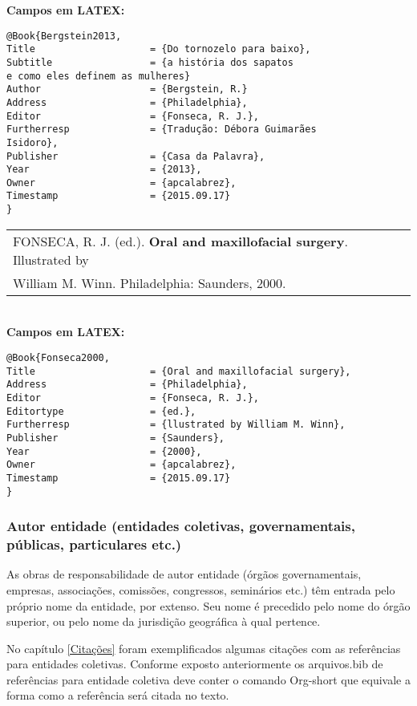 \textbf{Campos em LATEX:}

\begin{verbatim}
@Book{Bergstein2013,
Title                    = {Do tornozelo para baixo},
Subtitle                 = {a história dos sapatos 
e como eles definem as mulheres}
Author                   = {Bergstein, R.}
Address                  = {Philadelphia},
Editor                   = {Fonseca, R. J.},
Furtherresp              = {Tradução: Débora Guimarães
Isidoro},
Publisher                = {Casa da Palavra},
Year                     = {2013},
Owner                    = {apcalabrez},
Timestamp                = {2015.09.17}
}
\end{verbatim}

\begin{tabular}{|l|c|} \hline
	FONSECA, R. J. (ed.). \textbf{Oral and maxillofacial surgery}. Illustrated by\\
	William M. Winn. Philadelphia: Saunders, 2000. \\\hline
\end{tabular}\\

\textbf{Campos em LATEX:}

\begin{verbatim}
@Book{Fonseca2000,
Title                    = {Oral and maxillofacial surgery},
Address                  = {Philadelphia},
Editor                   = {Fonseca, R. J.},
Editortype               = {ed.},
Furtherresp              = {llustrated by William M. Winn},
Publisher                = {Saunders},
Year                     = {2000},
Owner                    = {apcalabrez},
Timestamp                = {2015.09.17}
}
\end{verbatim}


\subsubsection{Autor entidade (entidades coletivas, governamentais, públicas, particulares etc.)} 

As obras de responsabilidade de autor entidade (órgãos governamentais, empresas, associações, comissões, congressos, seminários etc.) têm entrada pelo próprio nome da entidade, por extenso. Seu nome é precedido pelo nome do órgão superior, ou pelo nome da jurisdição geográfica à qual pertence. 

No capítulo \ref{Citações} foram exemplificados algumas citações com  as referências para entidades coletivas. Conforme exposto anteriormente os arquivos.bib de referências para entidade coletiva deve conter o comando Org-short que equivale a forma como a referência será citada no texto. \\

